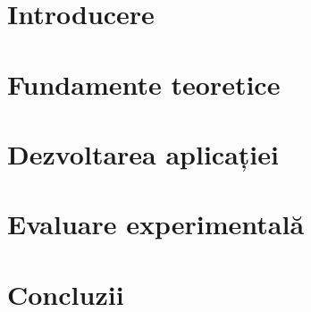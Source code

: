 \documentclass[12pt,a4paper]{report}
\newcommand\blankpage{%
	\null
	\thispagestyle{empty}%
	\addtocounter{page}{-1}%
	\newpage}
\begin{document}
\afterpage{\blankpage}

\restoregeometry

\setcounter{page}{3}


\newpage


\tableofcontents

\newpage
{}
\listoffigures

\newpage
{}
\listoftables

\newpage\null\newpage
\chapter{Introducere}


\newpage\null\newpage
\chapter{Fundamente teoretice}


\chapter{Dezvoltarea aplicației}


\newpage\null\newpage
\chapter{Evaluare experimentală}


\newpage\null\newpage
\chapter*{Concluzii}



\end{document}
